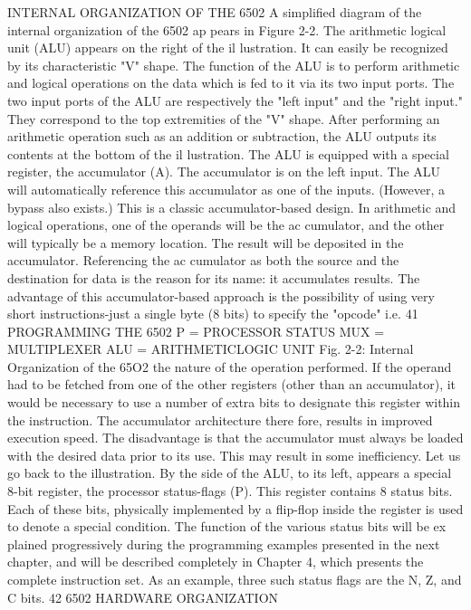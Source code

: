 INTERNAL ORGANIZATION OF THE 6502
A simplified diagram of the internal organization of the 6502 ap
pears in Figure 2-2.
The arithmetic logical unit (ALU) appears on the right of the il
lustration. It can easily be recognized by its characteristic "V"
shape. The function of the ALU is to perform arithmetic and logical
operations on the data which is fed to it via its two input ports. The
two input ports of the ALU are respectively the "left input" and the
"right input." They correspond to the top extremities of the "V"
shape. After performing an arithmetic operation such as an addition
or subtraction, the ALU outputs its contents at the bottom of the il
lustration.
The ALU is equipped with a special register, the accumulator (A).
The accumulator is on the left input. The ALU will automatically
reference this accumulator as one of the inputs. (However, a bypass
also exists.) This is a classic accumulator-based design. In
arithmetic and logical operations, one of the operands will be the ac
cumulator, and the other will typically be a memory location.
The result will be deposited in the accumulator. Referencing the ac
cumulator as both the source and the destination for data is the
reason for its name: it accumulates results. The advantage of this
accumulator-based approach is the possibility of using very short
instructions-just a single byte (8 bits) to specify the "opcode" i.e.
41
PROGRAMMING THE 6502
P = PROCESSOR
STATUS
MUX = MULTIPLEXER
ALU = ARITHMETICLOGIC
UNIT
Fig. 2-2: Internal Organization of the 65O2
the nature of the operation performed. If the operand had to be
fetched from one of the other registers (other than an accumulator),
it would be necessary to use a number of extra bits to designate this
register within the instruction. The accumulator architecture there
fore, results in improved execution speed. The disadvantage is that
the accumulator must always be loaded with the desired data prior
to its use. This may result in some inefficiency.
Let us go back to the illustration. By the side of the ALU, to its
left, appears a special 8-bit register, the processor status-flags (P).
This register contains 8 status bits. Each of these bits, physically
implemented by a flip-flop inside the register is used to denote a
special condition. The function of the various status bits will be ex
plained progressively during the programming examples presented
in the next chapter, and will be described completely in Chapter
4, which presents the complete instruction set. As an example,
three such status flags are the N, Z, and C bits.
42
6502 HARDWARE ORGANIZATION
